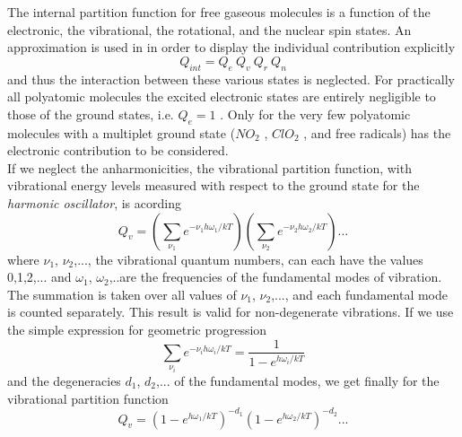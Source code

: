 The internal partition function for free gaseous molecules is a
function of the electronic, the vibrational, the rotational, and the
nuclear spin states. An approximation is used in
\citet{gordyandcook:70} in order to display the individual
contribution explicitly
\begin{equation}\label{int_partition}
 Q_{int}=Q_e~Q_v~Q_r~Q_n
\end{equation}
and thus the interaction between these various states is neglected.
For practically all polyatomic molecules the excited electronic states
are entirely negligible to those of the ground states, i.e. $Q_e=1$ .
Only for the very few polyatomic molecules with a multiplet ground
state ($NO_2$ , $ClO_2$ , and free radicals) has the
electronic contribution to be considered.\\
If we neglect the anharmonicities, the vibrational partition function,
with vibrational energy levels measured with respect to the ground
state for the {\it harmonic oscillator}, is acording \citet{herzberg:45}
\begin{equation}\label{vib_partition}
 Q_v=\left(\sum_{\nu_1}e^{-\nu_1 h\omega_1/kT}\right)\left(\sum_{\nu_2}e^{-\nu_2 h\omega_2/kT}\right)...
\end{equation}
where $\nu_1$, $\nu_2$,..., the vibrational quantum numbers, can each
have the values 0,1,2,... and $\omega_1$, $\omega_2$,..are the
frequencies of the fundamental modes of vibration. The summation is
taken over all values of $\nu_1$, $\nu_2$,..., and each fundamental
mode is counted separately. This result is valid for non-degenerate
vibrations. If we use the simple expression for geometric progression
\begin{equation}\label{geom_progression}
 \sum_{\nu_i}e^{-\nu_i h\omega_i/kT}=\frac{1}{1-e^{h\omega_i/kT}}
\end{equation}
and the degeneracies $d_1$, $d_2$,... of the fundamental modes, we get
finally for the vibrational partition function
\begin{equation}\label{vib_partition_fin}
Q_v=\left(1-e^{h\omega_1/kT}\right)^{-d_1}\left(1-e^{h\omega_2/kT}\right)^{-d_2}...
\end{equation}

